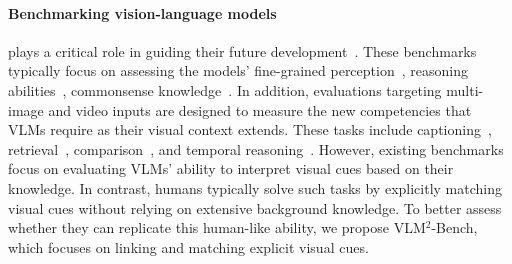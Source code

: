 \paragraph{Benchmarking vision-language models} plays a critical role in guiding their future development~\citep{liang2024hemm,mme,mmstar}. These benchmarks typically focus on assessing the models' fine-grained perception~\citep{li2024naturalbench,mmvp}, reasoning abilities~\citep{scienceqa,mmvet,wu-etal-2024-macaroon}, commonsense knowledge~\citep{yue2024mmmu}. In addition, evaluations targeting multi-image and video inputs are designed to measure the new competencies that VLMs require as their visual context extends. These tasks include captioning~\citep{yue2024mmmu,yu2019activitynet}, retrieval~\citep{wang2024muirbench,li2025migician}, comparison~\citep{MICBench,jiao2024img}, and temporal reasoning~\citep{liu2024tempcompass}.
However, existing benchmarks focus on evaluating VLMs' ability to interpret visual cues based on their knowledge. In contrast, humans typically solve such tasks by explicitly matching visual cues without relying on extensive background knowledge. To better assess whether they can replicate this human-like ability, we propose VLM$^2$-Bench, which focuses on linking and matching explicit visual cues.
